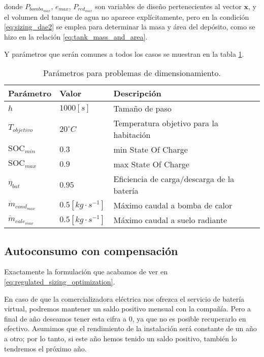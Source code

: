 donde $P_{bomba_{max}}$, $e_{max}$, $P_{red_{max}}$ son variables de diseño
pertenecientes al vector $\mathbf{x}$, y el volumen del tanque de agua no
aparece explícitamente, pero en la condición \eqref{eq:sizing_dae2} se emplea
para determinar la masa y área del depósito, como se hizo en la relación
\eqref{eq:tank_mass_and_area}.

Y parámetros que serán comunes a todos los casos se muestran en la tabla
\ref{tab:sizing_optimization_data}.

\begin{table}[ht]
	\centering
	\caption{Parámetros para problemas de dimensionamiento.}
	\label{tab:sizing_optimization_data}
	\begin{tabular}{@{}lll@{}}
		\toprule
		\textbf{Parámetro}     & \textbf{Valor}         & \textbf{Descripción}                       \\
		\midrule
		$h$                    & $1000[s]$              & Tamaño de paso                             \\
		$T_{objetivo}$         & $20 ^\circ C$          & Temperatura objetivo para la habitación    \\
		$\text{SOC}_{min}$     & $0.3$                  & min State Of Charge                        \\
		$\text{SOC}_{max}$     & $0.9$                  & max State Of Charge                        \\
		$\eta_{bat}$           & $0.95$                 & Eficiencia de carga/descarga de la batería \\
		$\dot{m}_{cond_{max}}$ & $0.5[kg \cdot s^{-1}]$ & Máximo caudal a bomba de calor             \\
		$\dot{m}_{cale_{max}}$ & $0.5[kg \cdot s^{-1}]$ & Máximo caudal a suelo radiante             \\
		\bottomrule
	\end{tabular}
\end{table}


\clearpage
\subsection{Autoconsumo con compensación}

Exactamente la formulación que acabamos de ver en
\eqref{eq:regulated_sizing_optimization}.

En caso de que la comercializadora eléctrica nos ofrezca el servicio de batería
virtual, podremos mantener un saldo positivo mensual con la compañía. Pero a
final de año deseamos tener esta cifra a 0, ya que no es posible recuperarlo en
efectivo. Asumimos que el rendimiento de la instalación será constante de un
año a otro; por lo tanto, si este año hemos tenido un saldo positivo, también
lo tendremos el próximo año.

